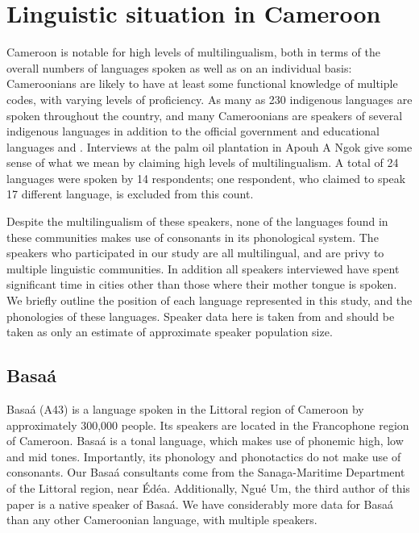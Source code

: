 \documentclass[output=paper
,newtxmath
,modfonts
,nonflat]{langsci/langscibook}
\begin{document}
\section{Linguistic situation in Cameroon}

Cameroon is notable for high levels of multilingualism, both in terms of the overall numbers of languages spoken as well as on an individual basis:  Cameroonians are likely to have at least some functional knowledge of multiple codes, with varying levels of proficiency. As many as 230 indigenous languages are spoken throughout the country, and many Cameroonians are speakers of several indigenous languages in addition to the official government and educational languages  and . Interviews at the palm oil plantation in Apouh A Ngok give some sense of what we mean by claiming high levels of multilingualism. A total of 24 languages were spoken by 14 respondents; one respondent, who claimed to speak 17 different language, is excluded from this count. 

Despite the multilingualism of these speakers, none of the languages found in these communities makes use of  consonants in its phonological system. The speakers who participated in our study  are all multilingual, and are privy to multiple linguistic communities. In addition all speakers interviewed have spent significant time in cities other than those where their mother tongue is spoken. We  briefly outline the position of each language represented in this study, and the phonologies of these languages. Speaker data here is taken from \citet{lewisetal2016} and should be taken as only an estimate of approximate speaker population size. 

\subsection{Basa\'a}

Basa\'a (A43) is a language spoken in the Littoral region of Cameroon by approximately 300,000 people. Its speakers are located in the Francophone region of Cameroon. Basa\'a is a tonal language, which makes use of phonemic high, low and mid tones. Importantly, its phonology and phonotactics do not make use of  consonants. Our Basa\'a consultants come from the Sanaga-Maritime Department of the Littoral region, near \'Ed\'ea. Additionally, Ngu\'{e} Um, the third author of this paper is a native speaker of Basa\'a. We have considerably more data for Basa\'{a} than any other Cameroonian language, with multiple speakers. 
\end{document}
